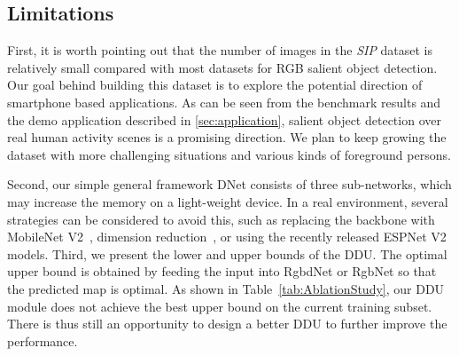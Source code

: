 \documentclass[journal]{IEEEtran}
\newcommand{\tabref}[1]{Table~\ref{#1}}
\newcommand{\secref}[1]{ \ref{#1}}
\newcommand{\fdp}[1]{#1}
\begin{document}
\subsection{Limitations}\label{sec:limitation}
First, it is worth pointing out that the number of images in
the \emph{SIP} dataset is relatively \fdp{small} compared with most
datasets for RGB \fdp{salient object detection.}
Our goal \fdp{behind building} this dataset is to explore the potential direction
of \fdp{smartphone} based application\fdp{s}. As can be seen from the benchmark results and the
demo application described in \secref{sec:application}, salient object detection
over real human \fdp{activity} scenes is a promising direction.
We plan to keep growing the dataset with more challenging situations and various kinds of foreground person\fdp{s}.

Second, our simple general framework DNet consists of three  sub-networks, which may increase the memory on \fdp{a} light-weight device.
In \fdp{a} real environment, \fdp{several} strategies can be considered \fdp{to avoid this,}
such as \fdp{replacing} the backbone with MobileNet V2~\cite{sandler2018mobilenetv2}, \fdp{dimension reduction~\cite{zhang2018local}},
or \fdp{using the recently} released ESPNet V2~\cite{mehta2018espnetv2} models.
\fdp{Third, we present the lower and upper bounds of the DDU.
The optimal upper bound is obtained by feeding the input
into RgbdNet or RgbNet so that the predicted map is optimal.
As shown in \tabref{tab:AblationStudy}, our DDU module does not
achieve the best upper bound on the current training subset.
There \fdp{is thus} still an opportunity to design a better DDU to further improve the performance.}
\end{document}
